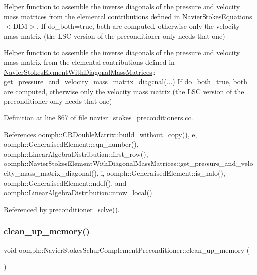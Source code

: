 Helper function to assemble the inverse diagonals of the pressure and velocity mass matrices from the elemental contributions defined in Navier\+Stokes\+Equations$<$\+D\+I\+M$>$. If do\+\_\+both=true, both are computed, otherwise only the velocity mass matrix (the L\+SC version of the preconditioner only needs that one) 

Helper function to assemble the inverse diagonals of the pressure and velocity mass matrix from the elemental contributions defined in \hyperlink{classoomph_1_1NavierStokesElementWithDiagonalMassMatrices}{Navier\+Stokes\+Element\+With\+Diagonal\+Mass\+Matrices}\+:\+: get\+\_\+pressure\+\_\+and\+\_\+velocity\+\_\+mass\+\_\+matrix\+\_\+diagonal(...) If do\+\_\+both=true, both are computed, otherwise only the velocity mass matrix (the L\+SC version of the preconditioner only needs that one) 

Definition at line 867 of file navier\+\_\+stokes\+\_\+preconditioners.\+cc.



References oomph\+::\+C\+R\+Double\+Matrix\+::build\+\_\+without\+\_\+copy(), e, oomph\+::\+Generalised\+Element\+::eqn\+\_\+number(), oomph\+::\+Linear\+Algebra\+Distribution\+::first\+\_\+row(), oomph\+::\+Navier\+Stokes\+Element\+With\+Diagonal\+Mass\+Matrices\+::get\+\_\+pressure\+\_\+and\+\_\+velocity\+\_\+mass\+\_\+matrix\+\_\+diagonal(), i, oomph\+::\+Generalised\+Element\+::is\+\_\+halo(), oomph\+::\+Generalised\+Element\+::ndof(), and oomph\+::\+Linear\+Algebra\+Distribution\+::nrow\+\_\+local().



Referenced by preconditioner\+\_\+solve().

\mbox{\label{classoomph_1_1NavierStokesSchurComplementPreconditioner_a5cac2493de85690e3954949eb2a27d2c}} 
\subsubsection{\texorpdfstring{clean\+\_\+up\+\_\+memory()}{clean\_up\_memory()}}
{\footnotesize\ttfamily void oomph\+::\+Navier\+Stokes\+Schur\+Complement\+Preconditioner\+::clean\+\_\+up\+\_\+memory (\begin{DoxyParamCaption}{ }\end{DoxyParamCaption})\hspace{0.3cm}{\ttfamily [virtual]}}



